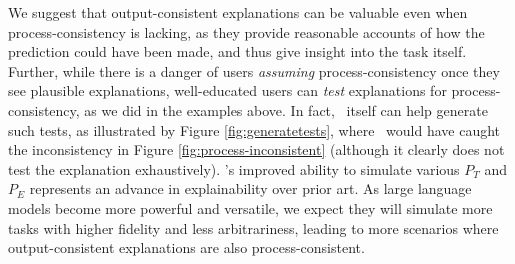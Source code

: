 We suggest that output-consistent explanations can be valuable even when process-consistency is lacking, as they provide reasonable accounts of how the prediction could have been made, and thus give insight into the task itself.
Further, while there is a danger of users \emph{assuming} process-consistency once they see plausible explanations, well-educated users can \emph{test} explanations for process-consistency, as we did in the examples above.
In fact, \DV\ itself can help generate such tests, as illustrated by Figure \ref{fig:generatetests}, where \DV\ would have caught the inconsistency in Figure \ref{fig:process-inconsistent} (although it clearly does not test the explanation exhaustively).
{\DV}'s improved ability to simulate various $P_T$ and $P_E$ represents an advance in explainability over prior art. As large language models become more powerful and versatile, we expect they will simulate more tasks with higher fidelity and less arbitrariness, leading to more scenarios where output-consistent explanations are also process-consistent.

